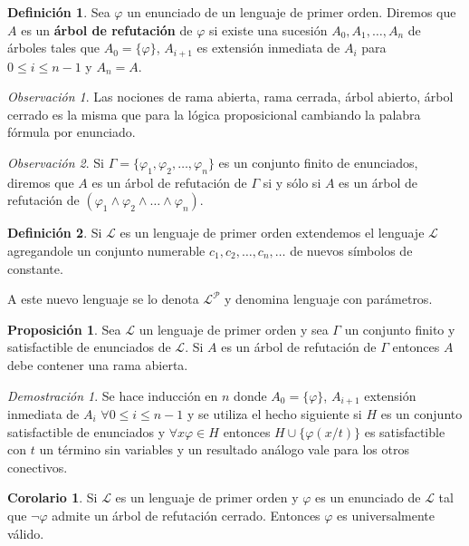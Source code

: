 \documentclass[a4paper,11pt]{article}
\theoremstyle{definition}
\newtheorem{defn}{Definición}[section]
\newtheorem{prop}{Proposición}[section]
\newtheorem{coro}{Corolario}[section]
\theoremstyle{remark}
\newtheorem*{remk}{Observación}
\newtheorem*{demo}{Demostración}
\def\LL{\ensuremath{\mathcal{L}}}
\def\PP{\ensuremath{\mathcal{P}}}
\begin{document}
\begin{defn}
    Sea $\varphi$ un enunciado de un lenguaje de primer orden. Diremos que
    $A$ es un \textbf{árbol de refutación} de $\varphi$ si existe una sucesión
    $A_0, A_1, \dots, A_n$ de árboles tales que $A_0 = \{\varphi\}$,
    $A_{i+1}$ es extensión inmediata de $A_i$ para $0 \le i \le n - 1$
    y $A_n = A$.
\end{defn}

\begin{remk}
    Las nociones de rama abierta, rama cerrada, árbol abierto, árbol cerrado
    es la misma que para la lógica proposicional cambiando la palabra
    fórmula por enunciado.
\end{remk}

\begin{remk}
    Si $\Gamma = \{\varphi_1, \varphi_2, \dots, \varphi_n \}$ es un conjunto
    finito de enunciados, diremos que $A$ es un árbol de refutación de $\Gamma$
    si y sólo si $A$ es un árbol de refutación de $(\varphi_1 \land \varphi_2
    \land \dots \land \varphi_n)$.
\end{remk}

\begin{defn}
    Si $\LL$ es un lenguaje de primer orden extendemos el lenguaje $\LL$
    agregandole un conjunto numerable $c_1, c_2, \dots, c_n, \dots$
    de nuevos símbolos de constante.
    
    A este nuevo lenguaje se lo denota $\LL^{\PP}$ y denomina lenguaje
    con parámetros.
\end{defn}

\begin{prop}
    Sea $\LL$ un lenguaje de primer orden y sea $\Gamma$ un conjunto finito 
    y satisfactible de enunciados de $\LL$. Si $A$ es un árbol de refutación
    de $\Gamma$ entonces $A$ debe contener una rama abierta. 
\end{prop}

\begin{demo}
    Se hace inducción en $n$ donde $A_0 = \{\varphi\}$, $A_{i+1}$
    extensión inmediata de $A_i$ $\forall 0 \le i \le n - 1$ y se utiliza
    el hecho siguiente si $H$ es un conjunto satisfactible de enunciados
    y $\forall x \varphi \in H$ entonces $H \cup \{ \varphi(x/t) \}$
    es satisfactible con $t$ un término sin variables y un resultado
    análogo vale para los otros conectivos.
\end{demo}

\begin{coro}
    Si $\LL$ es un lenguaje de primer orden y $\varphi$ es un enunciado de
    $\LL$ tal que $\lnot \varphi$ admite un árbol de refutación cerrado.
    Entonces $\varphi$ es universalmente válido.
\end{coro}
\end{document}
